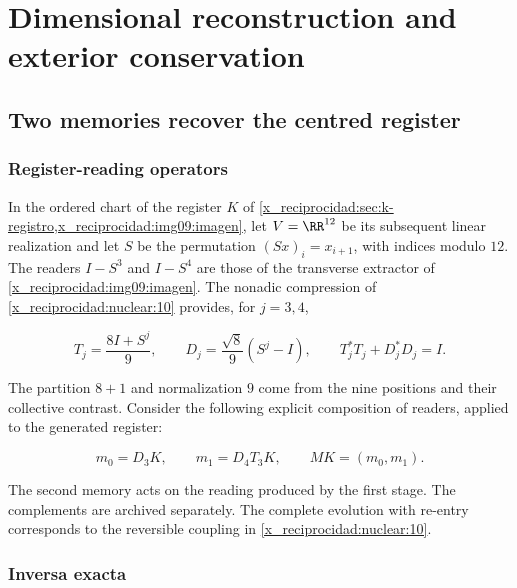 \chapter{Dimensional reconstruction and exterior conservation}
\label{x_reciprocidad:nuclear:11}
\section{Two memories recover the centred register}

\subsection{Register-reading operators}

In the ordered chart of the register \(K\) of
\cref{x_reciprocidad:sec:k-registro,x_reciprocidad:img09:imagen}, let \(V=\RR^{12}\) be its
subsequent linear realization and let \(S\) be the permutation
\((Sx)_i=x_{i+1}\), with indices modulo \(12\).
The readers \(I-S^3\) and \(I-S^4\) are those of the transverse extractor
of \cref{x_reciprocidad:img09:imagen}.
The nonadic compression of \cref{x_reciprocidad:nuclear:10} provides,
for \(j=3,4\),



\begin{equation}
T_j=\frac{8I+S^j}{9},\qquad D_j=\frac{\sqrt8}{9}(S^j-I),
\qquad T_j^*T_j+D_j^*D_j=I.
\label{x_reciprocidad:nuc11:eq:1}
\end{equation}



The partition \(8+1\) and normalization \(9\) come from the nine positions and their collective contrast. Consider the following explicit composition of readers, applied to the generated register:



\begin{equation}
m_0=D_3K,\qquad m_1=D_4T_3K,
\qquad M K=(m_0,m_1).
\label{x_reciprocidad:nuc11:eq:2}
\end{equation}



The second memory acts on the reading produced by the first stage. The complements are archived separately. The complete evolution with re-entry corresponds to the reversible coupling in \cref{x_reciprocidad:nuclear:10}.

\subsection{Inversa exacta}

